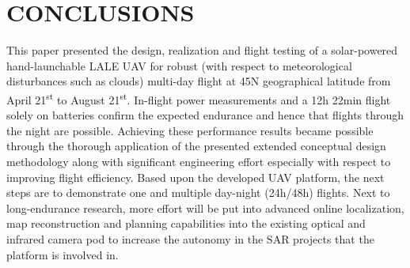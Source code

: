 \documentclass[letterpaper, 10 pt, conference]{ieeeconf}  %
\begin{document}
\section{CONCLUSIONS}
This paper presented the design, realization and flight testing of a solar-powered hand-launchable LALE UAV for robust (with respect to meteorological disturbances such as clouds) multi-day flight at 45\degree N geographical latitude from April 21\textsuperscript{st} to August 21\textsuperscript{st}. In-flight power measurements and a 12h 22min flight solely on batteries confirm the expected endurance and hence that flights through the night are possible. Achieving these performance results became possible through the thorough application of the presented extended conceptual design methodology along with significant engineering effort especially with respect to improving flight efficiency. Based upon the developed UAV platform, the next steps are to demonstrate one and multiple day-night (24h/48h) flights. Next to long-endurance research, more effort will be put into advanced online localization, map reconstruction and planning capabilities into the existing optical and infrared camera pod to increase the autonomy in the SAR projects that the platform is involved in.

\addtolength{\textheight}{-12cm}   %




\renewcommand{\UrlFont}{\scriptsize\rm}
\renewcommand*{\bibfont}{\footnotesize}
\begingroup
\setlength\bibitemsep{0pt}
\printbibliography
\endgroup
\end{document}

